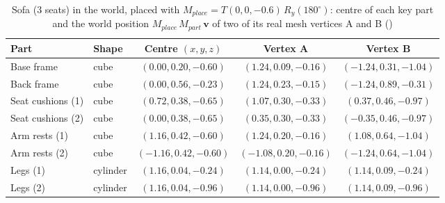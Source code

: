 \begin{table}[H]\centering\footnotesize
\caption{Sofa (3 seats) in the world, placed with $M_{place}=T(0, 0, -0.6)\,R_y(180^\circ)$: centre of each key part and the world position $M_{place}\,M_{part}\,\mathbf{v}$ of two of its real mesh vertices A and B ()}\label{tab:world_sofa}
\begin{tabular}{@{}l l c c c@{}}
\toprule
Part & Shape & Centre $(x,y,z)$ & Vertex A & Vertex B \\
\midrule
Base frame & cube & $(0.00, 0.20, -0.60)$ & $(1.24, 0.09, -0.16)$ & $(-1.24, 0.31, -1.04)$ \\
Back frame & cube & $(0.00, 0.56, -0.23)$ & $(1.24, 0.23, -0.15)$ & $(-1.24, 0.89, -0.31)$ \\
Seat cushions (1) & cube & $(0.72, 0.38, -0.65)$ & $(1.07, 0.30, -0.33)$ & $(0.37, 0.46, -0.97)$ \\
Seat cushions (2) & cube & $(0.00, 0.38, -0.65)$ & $(0.35, 0.30, -0.33)$ & $(-0.35, 0.46, -0.97)$ \\
Arm rests (1) & cube & $(1.16, 0.42, -0.60)$ & $(1.24, 0.20, -0.16)$ & $(1.08, 0.64, -1.04)$ \\
Arm rests (2) & cube & $(-1.16, 0.42, -0.60)$ & $(-1.08, 0.20, -0.16)$ & $(-1.24, 0.64, -1.04)$ \\
Legs (1) & cylinder & $(1.16, 0.04, -0.24)$ & $(1.14, 0.00, -0.24)$ & $(1.14, 0.09, -0.24)$ \\
Legs (2) & cylinder & $(1.16, 0.04, -0.96)$ & $(1.14, 0.00, -0.96)$ & $(1.14, 0.09, -0.96)$ \\
\bottomrule
\end{tabular}
\end{table}
